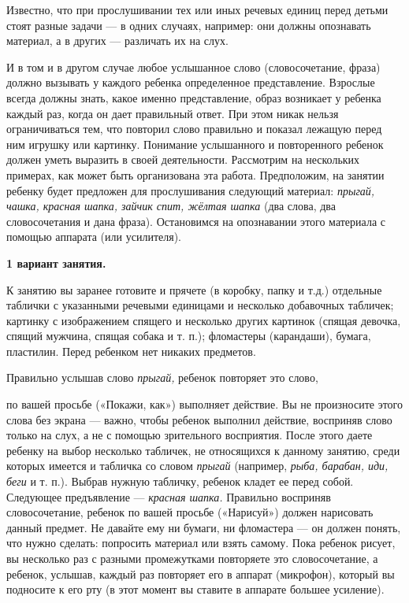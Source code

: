 \documentclass[a5paper]{book}
\renewcommand{\emph}[1]{\textit{#1}}
\begin{document}
Известно, что при прослушивании тех или иных речевых единиц перед детьми
стоят разные задачи --- в одних случаях, например: они должны опознавать
материал, а в других --- различать их на слух.

И в том и в другом случае любое услышанное слово (словосочетание, фраза)
должно вызывать у каждого ребенка определенное представление. Взрослые
всегда должны знать, какое именно представление, образ возникает у
ребенка каждый раз, когда он дает правильный ответ. При этом никак
нельзя ограничиваться тем, что повторил слово правильно и показал
лежащую перед ним игрушку или картинку. Понимание услышанного и
повторенного ребенок должен уметь выразить в своей деятельности.
Рассмотрим на нескольких примерах, как может быть организована эта
работа. Предположим, на занятии ребенку будет предложен для
прослушивания следующий материал: \emph{прыгай, чашка, красная шапка,
зайчик спит, жёлтая шапка} (два слова, два словосочетания и дана фраза).
Остановимся на опознавании этого материала с помощью аппарата (или
усилителя).

\textbf{1 вариант занятия.}

К занятию вы заранее готовите и прячете (в коробку, папку и т.д.)
отдельные таблички с указанными речевыми единицами и несколько
добавочных табличек; картинку с изображением спящего и несколько других
картинок (спящая девочка, спящий мужчина, спящая собака и т. п.);
фломастеры (карандаши), бумага, пластилин. Перед ребенком нет никаких
предметов.

Правильно услышав слово \emph{прыгай,} ребенок повторяет это слово,

по вашей просьбе («Покажи, как») выполняет действие. Вы не произносите
этого слова без экрана --- важно, чтобы ребенок выполнил действие,
восприняв слово только на слух, а не с помощью зрительного восприятия.
После этого даете ребенку на выбор несколько табличек, не относящихся к
данному занятию, среди которых имеется и табличка со словом
\emph{прыгай} (например, \emph{рыба, барабан, иди, беги} и т. п.).
Выбрав нужную табличку, ребенок кладет ее перед собой. Следующее
предъявление --- \emph{красная шапка.} Правильно восприняв
словосочетание, ребенок по вашей просьбе («Нарисуй») должен нарисовать
данный предмет. Не давайте ему ни бумаги, ни фломастера --- он должен
понять, что нужно сделать: попросить материал или взять самому. Пока
ребенок рисует, вы несколько раз с разными промежутками повторяете это
словосочетание, а ребенок, услышав, каждый раз повторяет его в аппарат
(микрофон), который вы подносите к его рту (в этот момент вы ставите в
аппарате большее усиление).
\end{document}
